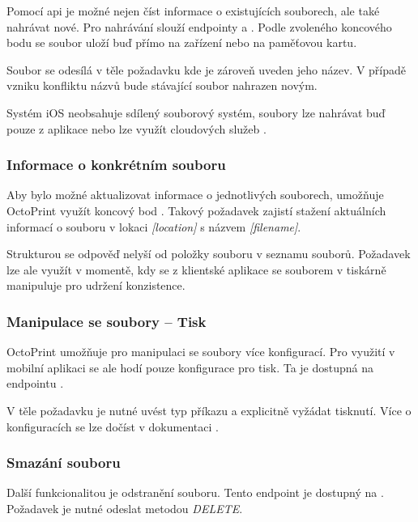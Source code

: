 Pomocí \acrshort{api} je možné nejen číst informace o existujících souborech, ale také nahrávat nové.
Pro nahrávání slouží endpointy  a .
Podle zvoleného koncového bodu se soubor uloží buď přímo na zařízení nebo na paměťovou kartu.

Soubor se odesílá v těle požadavku kde je zároveň uveden jeho název.
V případě vzniku konfliktu názvů bude stávající soubor nahrazen novým.

Systém iOS neobsahuje sdílený souborový systém, soubory lze nahrávat buď pouze z aplikace nebo lze využít cloudových služeb \cite{apple-file-system-basics}.

\subsubsection*{Informace o konkrétním souboru}

Aby bylo možné aktualizovat informace o jednotlivých souborech, umožňuje OctoPrint využít koncový bod .
Takový požadavek zajistí stažení aktuálních informací o souboru v lokaci \textit{[location]} s názvem \textit{[filename]}.

Strukturou se odpověď nelyší od položky souboru v seznamu souborů.
Požadavek lze ale využít v momentě, kdy se z klientské aplikace se souborem v tiskárně manipuluje pro udržení konzistence.

\subsubsection*{Manipulace se soubory -- Tisk}

OctoPrint umožňuje pro manipulaci se soubory více konfigurací.
Pro využití v mobilní aplikaci se ale hodí pouze konfigurace pro tisk.
Ta je dostupná na endpointu .

V těle požadavku je nutné uvést typ příkazu a explicitně vyžádat tisknutí.
Více o konfiguracích se lze dočíst v dokumentaci \cite{octoprint-api-filecommand}.

\subsubsection*{Smazání souboru}

Další funkcionalitou je odstranění souboru.
Tento endpoint je dostupný na .
Požadavek je nutné odeslat metodou \textit{DELETE}.

